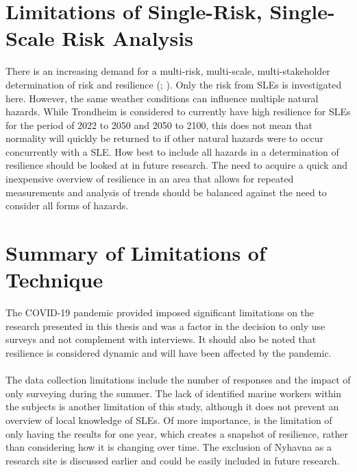 \section{Limitations of Single-Risk, Single-Scale Risk Analysis} \label{discussion-limitation-single-risk}
There is an increasing demand for a multi-risk, multi-scale, multi-stakeholder determination of risk and resilience (\cite{gerkensmeier_governing_2018}; \cite{cutter_community_2020}).  Only the risk from SLEs is investigated here. However, the same weather conditions can influence multiple natural hazards. While Trondheim is considered to currently have high resilience for SLEs for the period of 2022 to 2050 and 2050 to 2100, this does not mean that normality will quickly be returned to if  other natural hazards were to occur concurrently with a SLE. How best to include all hazards in a determination of resilience should be looked at in future research. The need to acquire a quick and inexpensive overview of resilience in an area that allows for repeated measurements and analysis of trends should be balanced against the need to consider all forms of hazards. 
\paragraph{}


\section{Summary of Limitations of Technique}
The COVID-19 pandemic provided imposed significant limitations on the research presented in this thesis and was a factor in the decision to only use surveys and not complement with interviews. It should also be noted that resilience is considered dynamic and will have been affected by the pandemic. 
\paragraph{}
The data collection limitations include the number of responses and the impact of only surveying during the summer. The lack of identified marine workers within the subjects is another limitation of this study, although it does not prevent an overview of local knowledge of SLEs. Of more importance, is the limitation of only having the results for one year, which creates a snapshot of resilience, rather than considering how it is changing over time. The exclusion of Nyhavna as a research site is discussed earlier and could be easily included in future research. 


